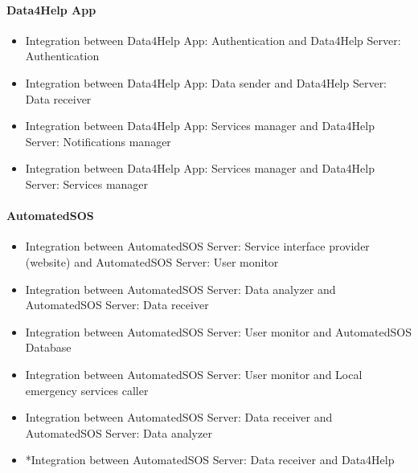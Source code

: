 		\paragraph{Data4Help App}
		\begin{itemize}
			\item{Integration between Data4Help App: Authentication and Data4Help Server: Authentication}
			\item{Integration between Data4Help App: Data sender and Data4Help Server: Data receiver}
			\item{Integration between Data4Help App: Services manager and Data4Help Server: Notifications manager}
			\item{Integration between Data4Help App: Services manager and Data4Help Server: Services manager}
		\end{itemize}

		\paragraph{AutomatedSOS}
		\begin{itemize}
			\item{Integration between AutomatedSOS Server: Service interface provider (website) and AutomatedSOS Server: User monitor}
			\item{Integration between AutomatedSOS Server: Data analyzer and AutomatedSOS Server: Data receiver}
			\item{Integration between AutomatedSOS Server: User monitor and AutomatedSOS Database}
			\item{Integration between AutomatedSOS Server: User monitor and Local emergency services caller}
			\item{Integration between AutomatedSOS Server: Data receiver and AutomatedSOS Server: Data analyzer}
			\item{*Integration between AutomatedSOS Server: Data receiver and Data4Help}
		\end{itemize}

